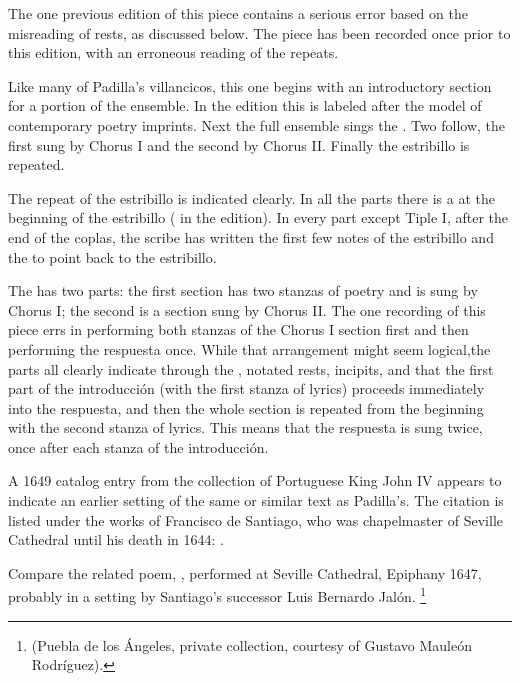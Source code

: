 The one previous edition of this piece contains a serious error based on the misreading of rests, as discussed below.
The piece has been recorded once prior to this edition, with an erroneous reading of the repeats.%
  \autocite{Padilla:HabanaCD}


Like many of Padilla's villancicos, this one begins with an introductory section for a portion of the ensemble.
In the edition this is labeled  after the model of contemporary poetry imprints.
Next the full ensemble sings the .
Two  follow, the first sung by Chorus I and the second by Chorus II. 
Finally the estribillo is repeated.

The repeat of the estribillo is indicated clearly.
In all the parts there is a  at the beginning of the estribillo ( in the edition).
In every part except Tiple I, after the end of the coplas, the scribe has written the first few notes of the estribillo and the  to point back to the estribillo.

The  has two parts: the first section has two stanzas of poetry and is sung by Chorus I; the second is a  section sung by Chorus II.
The one recording of this piece errs in performing both stanzas of the Chorus I section first and then performing the respuesta once.
While that arrangement might seem logical,the parts all clearly indicate through the , notated rests, incipits, and  that the first part of the introducción (with the first stanza of lyrics) proceeds immediately into the respuesta, and then the whole section is repeated from the beginning with the second stanza of lyrics.
This means that the respuesta is sung twice, once after each stanza of the introducción.


A 1649 catalog entry from the collection of Portuguese King John IV appears to indicate an earlier setting of the same or similar text as Padilla's.
The citation is listed under the works of Francisco de Santiago, who was chapelmaster of Seville Cathedral until his death in 1644: .%
  \autocite[caixão 26, no.~674]{JohnIV:Catalog}

Compare the related poem, , performed at Seville Cathedral, Epiphany 1647, probably in a setting by Santiago's successor Luis Bernardo Jalón.%
  \footnote{ (Puebla de los Ángeles, private collection, courtesy of Gustavo Mauleón Rodríguez).}

